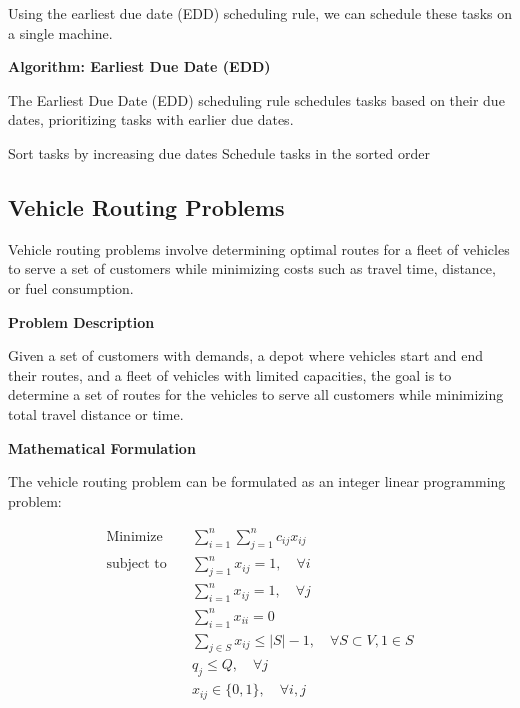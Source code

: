 \documentclass[12pt]{book} %
\begin{document}
Using the earliest due date (EDD) scheduling rule, we can schedule these tasks on a single machine.

\textbf{Algorithm: Earliest Due Date (EDD)}

The Earliest Due Date (EDD) scheduling rule schedules tasks based on their due dates, prioritizing tasks with earlier due dates.
\FloatBarrier
\begin{algorithm}[H]
\caption{Earliest Due Date (EDD) Algorithm}\label{alg:edd}
\begin{algorithmic}[1]
    \State Sort tasks by increasing due dates
    \State Schedule tasks in the sorted order
\EndProcedure
\end{algorithmic}
\end{algorithm}
\FloatBarrier

\subsection{Vehicle Routing Problems}

Vehicle routing problems involve determining optimal routes for a fleet of vehicles to serve a set of customers while minimizing costs such as travel time, distance, or fuel consumption.

\textbf{Problem Description}

Given a set of customers with demands, a depot where vehicles start and end their routes, and a fleet of vehicles with limited capacities, the goal is to determine a set of routes for the vehicles to serve all customers while minimizing total travel distance or time.

\textbf{Mathematical Formulation}

The vehicle routing problem can be formulated as an integer linear programming problem:

\[
\begin{aligned}
\text{Minimize} \quad & \sum_{i=1}^{n} \sum_{j=1}^{n} c_{ij} x_{ij} \\
\text{subject to} \quad & \sum_{j=1}^{n} x_{ij} = 1, \quad \forall i \\
& \sum_{i=1}^{n} x_{ij} = 1, \quad \forall j \\
& \sum_{i=1}^{n} x_{ii} = 0 \\
& \sum_{j \in S} x_{ij} \leq |S| - 1, \quad \forall S \subset V, 1 \in S \\
& q_j \leq Q, \quad \forall j \\
& x_{ij} \in \{0, 1\}, \quad \forall i, j
\end{aligned}
\]
\end{document}
